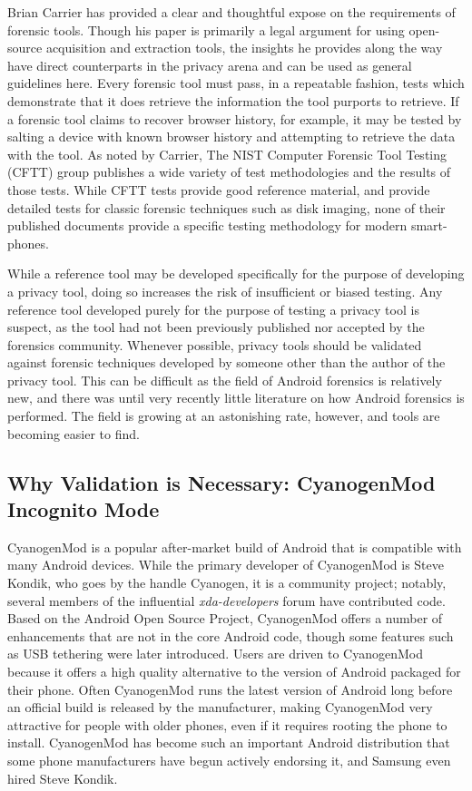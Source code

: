 Brian Carrier has provided a clear and thoughtful expose \cite{Carrier2003} on the requirements of forensic tools.  Though his paper
is primarily a legal argument for using open-source acquisition and extraction tools, the insights he provides along the way have
direct counterparts in the privacy arena and can be used as general guidelines here.  Every forensic tool must pass, in a repeatable
fashion, tests which demonstrate that it does retrieve the information the tool purports to retrieve.  If a forensic tool claims to
recover browser history, for example, it may be tested by salting a device with known browser history and attempting to retrieve the
data with the tool.  As noted by Carrier, The NIST Computer Forensic Tool Testing (CFTT) group publishes a wide variety of test
methodologies and the results of those tests.  While CFTT tests provide good reference material, and provide detailed tests for
classic forensic techniques such as disk imaging, none of their published documents provide a specific testing methodology for
modern smart-phones. 

While a reference tool may be developed specifically for the purpose of developing a privacy tool, doing so increases the risk of
insufficient or biased testing.  Any reference tool developed purely for the purpose of testing a privacy tool is suspect, as the
tool had not been previously published nor accepted by the forensics community.  Whenever possible, privacy tools should be
validated against forensic techniques developed by someone other than the author of the privacy tool.  This can be difficult as the
field of Android forensics is relatively new, and there was until very recently little literature on how Android forensics is
performed. The field is growing at an astonishing rate, however, and tools are becoming easier to find.

\subsection{Why Validation is Necessary: CyanogenMod Incognito Mode}

CyanogenMod is a popular after-market build of Android that is compatible with many Android devices.  While the primary developer of
CyanogenMod is Steve Kondik, who goes by the handle Cyanogen, it is a community project; notably, several members of the
influential \emph{xda-developers} forum have contributed code.  Based on the Android Open Source Project, CyanogenMod offers a
number of enhancements that are not in the core Android code, though some features such as USB tethering were later introduced.
Users are driven to CyanogenMod because it offers a high quality alternative to the version of Android packaged for their
phone.  Often CyanogenMod runs the latest version of Android long before an official build is released by the manufacturer, making
CyanogenMod very attractive for people with older phones, even if it requires rooting the phone to install.  CyanogenMod has become
such an important Android distribution that some phone manufacturers have begun actively endorsing it, and Samsung even hired Steve
Kondik.

